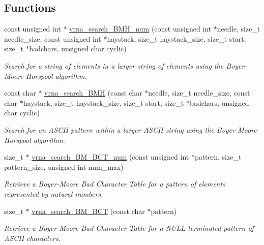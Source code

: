 \subsection*{Functions}
\begin{DoxyCompactItemize}
\item 
const unsigned int $\ast$ \mbox{\hyperlink{group__search__utils_ga8af89ab58905851f3dbd52624227d372}{vrna\+\_\+search\+\_\+\+B\+M\+H\+\_\+num}} (const unsigned int $\ast$needle, size\+\_\+t needle\+\_\+size, const unsigned int $\ast$haystack, size\+\_\+t haystack\+\_\+size, size\+\_\+t start, size\+\_\+t $\ast$badchars, unsigned char cyclic)
\begin{DoxyCompactList}\small\item\em Search for a string of elements in a larger string of elements using the Boyer-\/\+Moore-\/\+Horspool algorithm. \end{DoxyCompactList}\item 
const char $\ast$ \mbox{\hyperlink{group__search__utils_ga72574a7cf9786d825ce73f7f7748d3c4}{vrna\+\_\+search\+\_\+\+B\+MH}} (const char $\ast$needle, size\+\_\+t needle\+\_\+size, const char $\ast$haystack, size\+\_\+t haystack\+\_\+size, size\+\_\+t start, size\+\_\+t $\ast$badchars, unsigned char cyclic)
\begin{DoxyCompactList}\small\item\em Search for an A\+S\+C\+II pattern within a larger A\+S\+C\+II string using the Boyer-\/\+Moore-\/\+Horspool algorithm. \end{DoxyCompactList}\item 
size\+\_\+t $\ast$ \mbox{\hyperlink{group__search__utils_gad315a442e099c86c5dbf6c1c7933223d}{vrna\+\_\+search\+\_\+\+B\+M\+\_\+\+B\+C\+T\+\_\+num}} (const unsigned int $\ast$pattern, size\+\_\+t pattern\+\_\+size, unsigned int num\+\_\+max)
\begin{DoxyCompactList}\small\item\em Retrieve a Boyer-\/\+Moore Bad Character Table for a pattern of elements represented by natural numbers. \end{DoxyCompactList}\item 
size\+\_\+t $\ast$ \mbox{\hyperlink{group__search__utils_ga1d675ef5dcdcc8c33a1b79956a246697}{vrna\+\_\+search\+\_\+\+B\+M\+\_\+\+B\+CT}} (const char $\ast$pattern)
\begin{DoxyCompactList}\small\item\em Retrieve a Boyer-\/\+Moore Bad Character Table for a N\+U\+L\+L-\/terminated pattern of A\+S\+C\+II characters. \end{DoxyCompactList}\end{DoxyCompactItemize}


